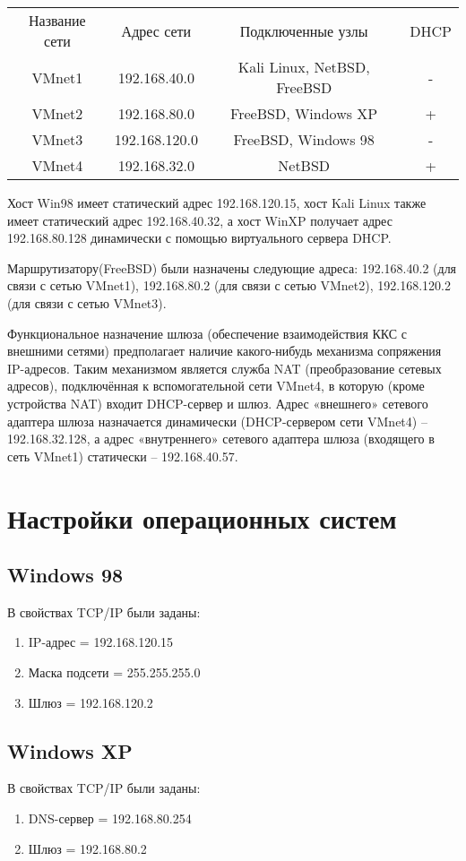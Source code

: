 \documentclass[14pt,a4paper,report]{report}
\begin{document}
\begin{center}
\begin{tabular}{ c c c c }
 Название сети & Адрес сети & Подключенные узлы  & DHCP \\ 

VMnet1&192.168.40.0&Kali Linux, NetBSD, FreeBSD& -\\ 
VMnet2&192.168.80.0&FreeBSD, Windows XP&+\\ 
VMnet3&192.168.120.0&FreeBSD, Windows 98&-\\ 
VMnet4&192.168.32.0&NetBSD&+\\ 
\end{tabular}
\end{center}


Хост Win98 имеет статический адрес 192.168.120.15, хост Kali Linux также имеет статический адрес 192.168.40.32, а хост WinXP получает адрес 192.168.80.128 динамически с помощью виртуального сервера DHCP.

Маршрутизатору(FreeBSD) были назначены следующие адреса: 192.168.40.2 (для связи с сетью VMnet1), 192.168.80.2 (для связи с сетью VMnet2), 192.168.120.2 (для связи с сетью VMnet3).

Функциональное назначение шлюза (обеспечение взаимодействия ККС с внешними сетями) предполагает наличие какого-нибудь механизма сопряжения IP-адресов. Таким механизмом является служба NAT (преобразование сетевых адресов), подключённая к вспомогательной сети VMnet4, в которую (кроме устройства NAT) входит DHCP-сервер и шлюз. Адрес «внешнего» сетевого адаптера шлюза назначается динамически (DHCP-сервером сети VMnet4) – 192.168.32.128, а адрес «внутреннего» сетевого адаптера шлюза (входящего в сеть VMnet1) статически – 192.168.40.57.


\section{Настройки операционных систем}
\subsection{Windows 98}
В свойствах TCP/IP были заданы:
\begin{enumerate}
\item IP-адрес = 192.168.120.15
\item Маска подсети = 255.255.255.0
\item Шлюз = 192.168.120.2
\end{enumerate}

\subsection{Windows XP}
В свойствах TCP/IP были заданы:
\begin{enumerate}
\item DNS-сервер = 192.168.80.254
\item Шлюз = 192.168.80.2
\end{enumerate}
\end{document}
